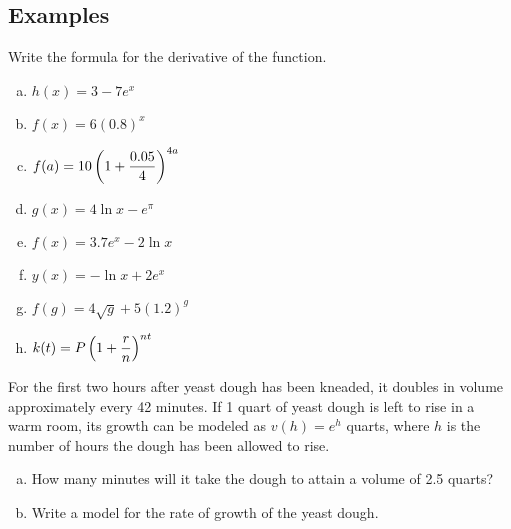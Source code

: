 \documentclass[notes]{subfiles}
\begin{document}
	\subsection*{Examples}
		\begin{ex}  Write the formula for the derivative of the function.
			\begin{enumerate}[(a)]
				\item $h(x) = 3-7e^x$  
					
				\item $f(x) = 6(0.8)^x$ 
					
				\item $f(a) = 10\left( 1+\dfrac{0.05}{4}\right)^{4a}$ 
					
				\item $g(x) = 4\ln x - e^\pi$ 
					\newpage
					
				\item $f(x) = 3.7e^x - 2\ln x$ 
					
				\item $y(x) = -\ln x + 2e^x$ 
					
				\item $f(g) = 4\sqrt{g} + 5(1.2)^g$ 	
					
				\item $k(t) = P\left( 1+\dfrac{r}{n}\right)^{nt}$ 
					
			\end{enumerate}
		\end{ex}
			\newpage
					
		\begin{ex}
			For the first two hours after yeast dough has been kneaded, it doubles in volume approximately every 42 minutes.  If 1 quart of yeast dough is left to rise in a warm room, its growth can be modeled as $v(h) = e^h$ quarts, where $h$ is the number of hours the dough has been allowed to rise.
			\begin{enumerate}[(a)]
				\item How many minutes will it take the dough to attain a volume of 2.5 quarts?  
				\item Write a model for the rate of growth of the yeast dough. 
			\end{enumerate}
		\end{ex}
		
\end{document}
